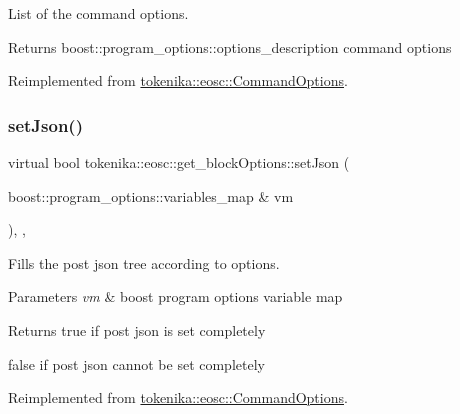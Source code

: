 List of the command options. 

\begin{DoxyReturn}{Returns}
boost\+::program\+\_\+options\+::options\+\_\+description command options 
\end{DoxyReturn}


Reimplemented from \hyperlink{classtokenika_1_1eosc_1_1_command_options_aa55960f380250eb7065cb6489b67196f}{tokenika\+::eosc\+::\+Command\+Options}.

\mbox{\label{classtokenika_1_1eosc_1_1get__block_options_acb69f3c1fb4dc9b86d070111602a69e0}} 
\subsubsection{\texorpdfstring{set\+Json()}{setJson()}}
{\footnotesize\ttfamily virtual bool tokenika\+::eosc\+::get\+\_\+block\+Options\+::set\+Json (\begin{DoxyParamCaption}\item[{boost\+::program\+\_\+options\+::variables\+\_\+map \&}]{vm }\end{DoxyParamCaption})\hspace{0.3cm}{\ttfamily [inline]}, {\ttfamily [protected]}, {\ttfamily [virtual]}}



Fills the post json tree according to options. 


\begin{DoxyParams}{Parameters}
{\em vm} & boost program options variable map \\
\hline
\end{DoxyParams}
\begin{DoxyReturn}{Returns}
true if post json is set completely 

false if post json cannot be set completely 
\end{DoxyReturn}


Reimplemented from \hyperlink{classtokenika_1_1eosc_1_1_command_options_a7aecc9aa79ca65f6abbd568ff8ff77a7}{tokenika\+::eosc\+::\+Command\+Options}.

\mbox{\label{classtokenika_1_1eosc_1_1get__block_options_ae4700d2d07381825120bed34148b76f0}} 
